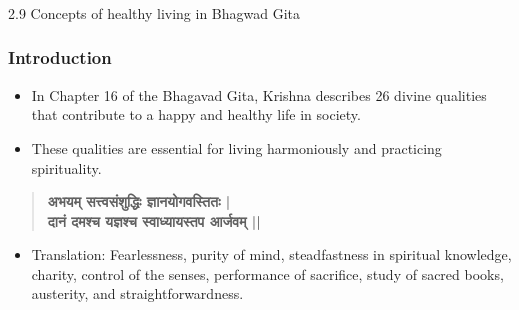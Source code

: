 \begin{frame}[fragile]\frametitle{}
\begin{center}
{\Large 2.9  Concepts of healthy living in Bhagwad Gita}
\end{center}
\end{frame}

\begin{frame}[fragile]\frametitle{Introduction}
    \begin{itemize}
        \item In Chapter 16 of the Bhagavad Gita, Krishna describes 26 divine qualities that contribute to a happy and healthy life in society.
        \item These qualities are essential for living harmoniously and practicing spirituality.
    \end{itemize}
    \begin{quote}
        \textbf{अभयम् सत्त्वसंशुद्धिः ज्ञानयोगवस्तितः |}\\
        \textbf{दानं दमश्च यज्ञश्च स्वाध्यायस्तप आर्जवम् ||}
    \end{quote}
    \begin{itemize}
        \item Translation: Fearlessness, purity of mind, steadfastness in spiritual knowledge, charity, control of the senses, performance of sacrifice, study of sacred books, austerity, and straightforwardness.
    \end{itemize}
\end{frame}

